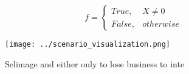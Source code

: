 \documentclass[a4paper]{article}
\begin{document}
\begin{equation}   f =
\begin{cases} True, & X \neq 0\\
False, & otherwise
\end{cases}
\end{equation}

\begin{figure}
\centering
\texttt{[image: ../scenario\_visualization.png]}
\caption{Selimage and either only to lose business to inte
}
\end{figure}
 
\end{document}
